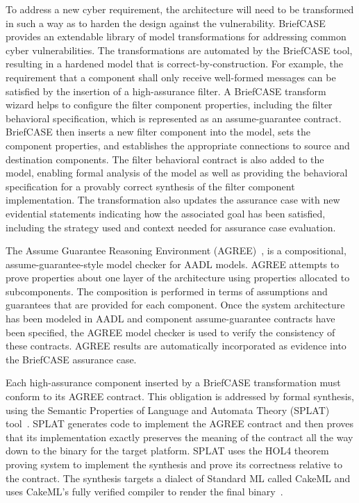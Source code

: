 To address a new cyber requirement, the architecture will need to be transformed in such a way as to harden the design against the vulnerability. BriefCASE provides an extendable library of model transformations for addressing common cyber vulnerabilities. 
The transformations are automated by the BriefCASE tool, resulting in a hardened model that is correct-by-construction. 
For example, the requirement that a component shall only receive well-formed messages can be satisfied by the insertion of a high-assurance filter. A BriefCASE transform wizard helps to configure the filter component properties, including the filter behavioral specification, which is represented as an assume-guarantee contract. BriefCASE then inserts a new filter component into the model, sets the component properties, and establishes the appropriate connections to source and destination components. The filter behavioral contract is also added to the model, enabling formal analysis of the model as well as providing the behavioral specification for a provably correct synthesis of the filter component implementation. 
The transformation also updates the assurance case with new evidential statements indicating how the associated goal has been satisfied, including the strategy used and context needed for assurance case evaluation.

The Assume Guarantee Reasoning Environment (AGREE)~\cite{compositional-analysis-agree}, is a compositional, assume-guarantee-style model checker for AADL models. AGREE attempts to prove properties about one layer of the architecture using properties allocated to subcomponents. The composition is performed in terms of assumptions and guarantees that are provided for each component.  
Once the system architecture has been modeled in AADL and component assume-guarantee contracts have been specified, the AGREE model checker is used to verify the consistency of these contracts.
AGREE results are automatically incorporated as evidence into the BriefCASE assurance case.

Each high-assurance component inserted by a BriefCASE transformation must conform to its AGREE contract. 
This obligation is addressed by formal synthesis, using the Semantic Properties of Language and Automata Theory (SPLAT) tool~\cite{case-models-2021}. SPLAT generates code to implement the AGREE contract and then proves that its implementation exactly preserves the meaning of the contract all the way down to the binary for the target platform.
%
SPLAT uses the HOL4 theorem proving system to implement the synthesis and prove its correctness relative to the contract. The synthesis targets a dialect of Standard ML called CakeML and uses CakeML’s fully verified compiler to render the final binary~\cite{cakeml}. 


